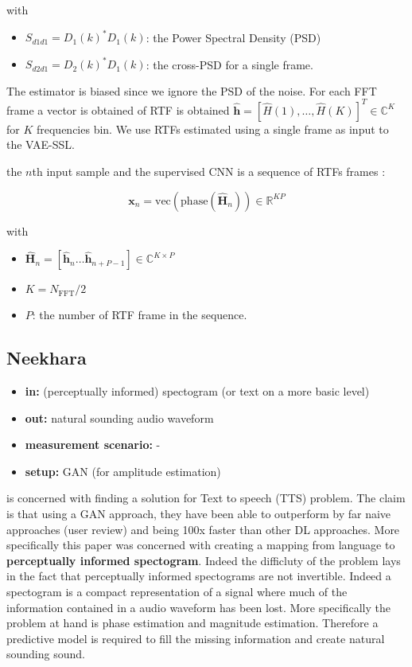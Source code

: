 \documentclass{article}
\begin{document}
with 

\begin{itemize}
    \item $S_{d1d1} = D_1(k)^{\ast} D_1(k)$: the Power Spectral Density (PSD)
    \item $S_{d2d1} = D_2(k)^{\ast} D_1(k)$: the cross-PSD for a single frame.
\end{itemize}

The estimator is biased since we ignore the PSD of the noise. For each FFT frame a vector is obtained of RTF is obtained $\hat{\mathbf{h}} = [\hat{H}(1), \dots, \hat{H}(K)]^T \in \mathbb{C}^K$ for $K$ frequencies bin. We use RTFs estimated using a single frame as input to the VAE-SSL.

the $n$th input sample and the supervised CNN is a sequence of RTFs frames :

\begin{equation}
        \mathbf{x}_n = \text{vec}(\text{phase}(\hat{\mathbf{H}}_n)) \in \mathbb{R}^{KP}
\end{equation}

with 

\begin{itemize}
    \item $\hat{\mathbf{H}}_n = [\hat{\mathbf{h}}_n \dots \hat{\mathbf{h}}_{n+P-1}] \in \mathbb{C}^{K \times P}$
    \item $K = N_{\text{FFT}}/2$
    \item $P$: the number of RTF frame in the sequence. 
\end{itemize}

\subsection{Neekhara}

\begin{itemize}
    \item \textbf{in:} (perceptually informed) spectogram (or text on a more basic level)
    \item \textbf{out:} natural sounding audio waveform
    \item \textbf{measurement scenario:} -
    \item \textbf{setup:} GAN (for amplitude estimation)
\end{itemize}

\cite{neekhara2019expediting} is concerned with finding a solution for Text to speech (TTS) problem. The claim is that using a GAN approach, they have been able to outperform by far naive approaches (user review) and being 100x faster than other DL approaches. More specifically this paper was concerned with creating a mapping from language to \textbf{perceptually informed spectogram}. Indeed the difficluty of the problem lays in the fact that perceptually informed spectograms are not invertible. Indeed a spectogram is a compact representation of a signal where much of the information contained in a audio waveform has been lost. More specifically the problem at hand is phase estimation and magnitude estimation. Therefore a predictive model is required to fill the missing information and create natural sounding sound.
\end{document}
